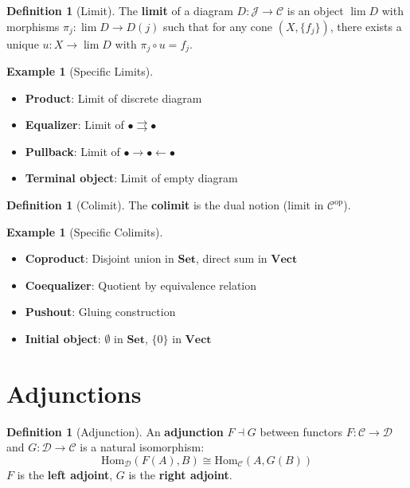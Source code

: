 \documentclass[11pt,a4paper,openright]{book}
\theoremstyle{plain}
\theoremstyle{definition}
\newtheorem{definition}[theorem]{Definition}
\newtheorem{example}[theorem]{Example}
\newcommand{\Hom}{\mathrm{Hom}}
\newcommand{\op}{\mathrm{op}}
\newcommand{\Set}{\mathbf{Set}}
\begin{document}
\begin{definition}[Limit]
The \textbf{limit} of a diagram $D: \mathcal{J} \to \mathcal{C}$ is an object $\lim D$ with morphisms $\pi_j: \lim D \to D(j)$ such that for any cone $(X, \{f_j\})$, there exists a unique $u: X \to \lim D$ with $\pi_j \circ u = f_j$.
\end{definition}

\begin{example}[Specific Limits]
\begin{itemize}
    \item \textbf{Product}: Limit of discrete diagram
    \item \textbf{Equalizer}: Limit of $\bullet \rightrightarrows \bullet$
    \item \textbf{Pullback}: Limit of $\bullet \to \bullet \leftarrow \bullet$
    \item \textbf{Terminal object}: Limit of empty diagram
\end{itemize}
\end{example}

\begin{definition}[Colimit]
The \textbf{colimit} is the dual notion (limit in $\mathcal{C}^{\op}$).
\end{definition}

\begin{example}[Specific Colimits]
\begin{itemize}
    \item \textbf{Coproduct}: Disjoint union in $\Set$, direct sum in $\mathbf{Vect}$
    \item \textbf{Coequalizer}: Quotient by equivalence relation
    \item \textbf{Pushout}: Gluing construction
    \item \textbf{Initial object}: $\emptyset$ in $\Set$, $\{0\}$ in $\mathbf{Vect}$
\end{itemize}
\end{example}

\section{Adjunctions}

\begin{definition}[Adjunction]
An \textbf{adjunction} $F \dashv G$ between functors $F: \mathcal{C} \to \mathcal{D}$ and $G: \mathcal{D} \to \mathcal{C}$ is a natural isomorphism:
\begin{equation}
\Hom_{\mathcal{D}}(F(A), B) \cong \Hom_{\mathcal{C}}(A, G(B))
\end{equation}
$F$ is the \textbf{left adjoint}, $G$ is the \textbf{right adjoint}.
\end{definition}
\end{document}
